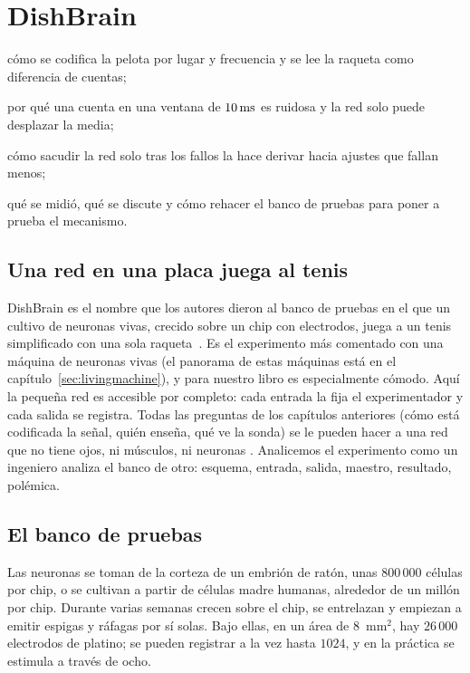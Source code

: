 \chapter{DishBrain}
\label{sec:dishbrain}
\begin{chaptergoals}
\item cómo se codifica la pelota por lugar y frecuencia y se lee la raqueta como diferencia de cuentas;
\item por qué una cuenta en una ventana de $10\,\text{ms}$ es ruidosa y la red solo puede desplazar la media;
\item cómo sacudir la red solo tras los fallos la hace derivar hacia ajustes que fallan menos;
\item qué se midió, qué se discute y cómo rehacer el banco de pruebas para poner a prueba el mecanismo.
\end{chaptergoals}

\section{Una red en una placa juega al tenis}

DishBrain es el nombre que los autores dieron al banco de pruebas en el que un cultivo de neuronas vivas, crecido sobre un chip con electrodos, juega a un tenis simplificado con una sola raqueta~\cite{Kagan2022}. Es el experimento más comentado con una máquina de neuronas vivas (el panorama de estas máquinas está en el capítulo~\ref{sec:livingmachine}), y para nuestro libro es especialmente cómodo. Aquí la pequeña red es accesible por completo: cada entrada la fija el experimentador y cada salida se registra. Todas las preguntas de los capítulos anteriores (cómo está codificada la señal, quién enseña, qué ve la sonda) se le pueden hacer a una red que no tiene ojos, ni músculos, ni neuronas . Analicemos el experimento como un ingeniero analiza el banco de otro: esquema, entrada, salida, maestro, resultado, polémica.

\section{El banco de pruebas}

Las neuronas se toman de la corteza de un embrión de ratón, unas $800\,000$ células por chip, o se cultivan a partir de células madre humanas, alrededor de un millón por chip. Durante varias semanas crecen sobre el chip, se entrelazan y empiezan a emitir espigas y ráfagas por sí solas. Bajo ellas, en un área de $8$~mm$^2$, hay $26\,000$ electrodos de platino; se pueden registrar a la vez hasta $1024$, y en la práctica se estimula a través de ocho.

